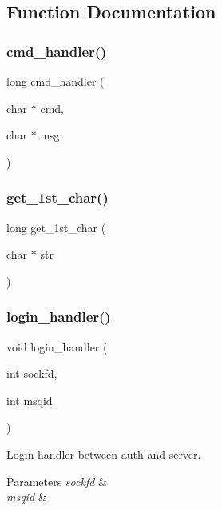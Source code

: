 \subsection{Function Documentation}
\mbox{\label{server_8c_a9fab57195d50c5f2b55f2744232ad64d}} 
\subsubsection{cmd\+\_\+handler()}
{\footnotesize\ttfamily long cmd\+\_\+handler (\begin{DoxyParamCaption}\item[{char $\ast$}]{cmd,  }\item[{char $\ast$}]{msg }\end{DoxyParamCaption})}

\mbox{\label{server_8c_a224345045f1250d5768d42d8cc9e3dab}} 
\subsubsection{get\+\_\+1st\+\_\+char()}
{\footnotesize\ttfamily long get\+\_\+1st\+\_\+char (\begin{DoxyParamCaption}\item[{char $\ast$}]{str }\end{DoxyParamCaption})}

\mbox{\label{server_8c_a7c71d69d21fd5c82ce5af6aee230d25e}} 
\subsubsection{login\+\_\+handler()}
{\footnotesize\ttfamily void login\+\_\+handler (\begin{DoxyParamCaption}\item[{int}]{sockfd,  }\item[{int}]{msqid }\end{DoxyParamCaption})}



Login handler between auth and server. 


\begin{DoxyParams}{Parameters}
{\em sockfd} & \\
\hline
{\em msqid} & \\
\hline
\end{DoxyParams}
\mbox{\label{server_8c_ae66f6b31b5ad750f1fe042a706a4e3d4}} 
